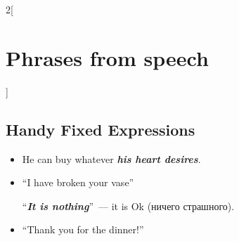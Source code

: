\documentclass[10pt,a4paper]{article}
\newlength{\OriginalParIndent}
\newcommand\ex[1]{\textit{\textbf{{#1}}}}           %
\newenvironment{ItemizeWithOrigParIndent}
    {\begin{itemize}[leftmargin=\OriginalParIndent]}
    {\end{itemize}}
\begin{document}
\setcounter{secnumdepth}{2} %
\begin{multicols}{2}[\section{Phrases from speech}]



\subsection{Handy Fixed Expressions}
\begin{ItemizeWithOrigParIndent}
   \item He can buy whatever \ex{his heart desires}.
   \item ``I have broken your vase''

   ``\ex{It is nothing}''~--- it is Ok (ничего страшного).

   \item ``Thank you for the dinner!''


\end{ItemizeWithOrigParIndent}
\end{multicols}
\end{document}
